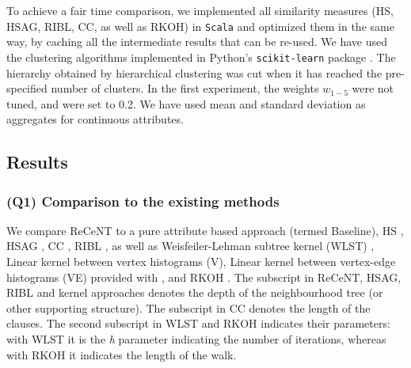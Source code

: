 To achieve a fair time comparison, we implemented all similarity measures (HS, HSAG, RIBL, CC, as well as RKOH) in \texttt{Scala} and optimized them in the same way, by caching all the intermediate results that can be re-used.
We have used the clustering algorithms implemented in Python's \texttt{scikit-learn} package \cite{scikit-learn}.
The hierarchy obtained by hierarchical clustering was cut when it has reached the pre-specified number of clusters.  
In the first experiment, the weights $w_{1-5}$ were not tuned, and were set to 0.2.
We have used mean and standard deviation as aggregates for continuous attributes.






\subsection{Results} 
\label{sec:ResultsSub}



\subsubsection{\textbf{(Q1) Comparison to the existing methods}}

We compare ReCeNT to a pure attribute based approach (termed Baseline), HS \cite{Neville03clusteringrelational}, HSAG \cite{WitsenburgB11a}, CC \cite{Fonseca2012}, RIBL \cite{RIBL96}, as well as Weisfeiler-Lehman subtree kernel (WLST) \cite{shervashidze09fastsubtree}, Linear kernel between vertex histograms (V), Linear kernel between vertex-edge histograms (VE) provided with \cite{NIPS2015_5688}, and RKOH \cite{WachmanK07}. 
The subscript in ReCeNT, HSAG, RIBL and kernel approaches  denotes the depth of the neighbourhood tree (or other supporting structure).
The subscript in CC denotes the length of the clauses.
The second subscript in WLST and RKOH indicates their parameters: with WLST it is the \textit{h} parameter indicating the number of iterations, whereas with RKOH it indicates the length of the walk.



